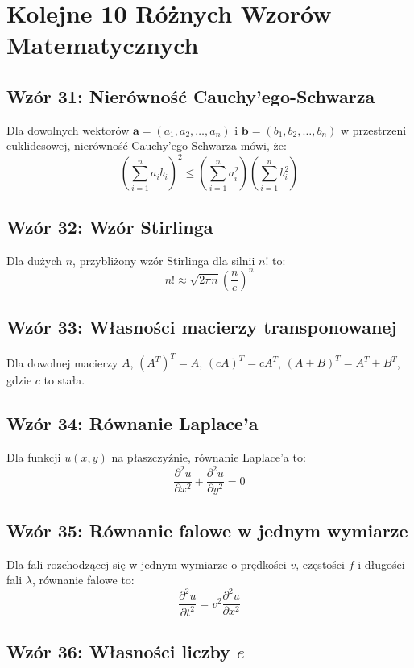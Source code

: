 \documentclass{article}
\begin{document}
\section*{Kolejne 10 Różnych Wzorów Matematycznych}

\subsection*{Wzór 31: Nierówność Cauchy'ego-Schwarza}

Dla dowolnych wektorów \(\mathbf{a} = (a_1, a_2, \ldots, a_n)\) i \(\mathbf{b} = (b_1, b_2, \ldots, b_n)\) w przestrzeni euklidesowej, nierówność Cauchy'ego-Schwarza mówi, że:
\[ \left(\sum_{i=1}^{n} a_i b_i\right)^2 \leq \left(\sum_{i=1}^{n} a_i^2\right) \left(\sum_{i=1}^{n} b_i^2\right) \]

\subsection*{Wzór 32: Wzór Stirlinga}

Dla dużych \(n\), przybliżony wzór Stirlinga dla silnii \(n!\) to:
\[ n! \approx \sqrt{2\pi n} \left(\frac{n}{e}\right)^n \]

\subsection*{Wzór 33: Własności macierzy transponowanej}

Dla dowolnej macierzy \(A\), \((A^T)^T = A\), \((cA)^T = cA^T\), \((A + B)^T = A^T + B^T\), gdzie \(c\) to stała.

\subsection*{Wzór 34: Równanie Laplace'a}

Dla funkcji \(u(x, y)\) na płaszczyźnie, równanie Laplace'a to:
\[ \frac{\partial^2u}{\partial x^2} + \frac{\partial^2u}{\partial y^2} = 0 \]

\subsection*{Wzór 35: Równanie falowe w jednym wymiarze}

Dla fali rozchodzącej się w jednym wymiarze o prędkości \(v\), częstości \(f\) i długości fali \(\lambda\), równanie falowe to:
\[ \frac{\partial^2u}{\partial t^2} = v^2 \frac{\partial^2u}{\partial x^2} \]

\subsection*{Wzór 36: Własności liczby \(e\)}
\end{document}
